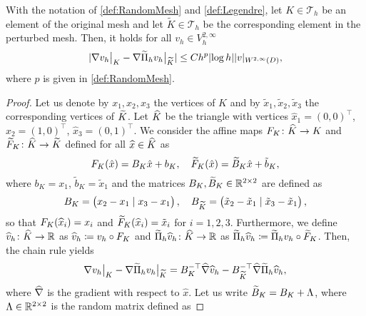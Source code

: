 \documentclass[10pt]{article}
\begin{document}
\begin{lemma}\label{lem:Interp_BoundKKTilde} With the notation of \cref{def:RandomMesh} and \cref{def:Legendre}, let $K \in \mathcal T_h$ be an element of the original mesh and let $\widetilde K \in \mathcal T_h$ be the corresponding element in the perturbed mesh. Then, it holds for all $v_h \in V_h^{2, \infty}$
	\begin{equation}
		\lvert\nabla v_h\bigr\rvert_{K} - \nabla \widetilde \Pi_h v_h \bigr\rvert_{\widetilde K}\rvert \leq C h^p \lvert\log h\rvert \lvert v\rvert_{W^{2, \infty}(D)},
	\end{equation}
	where $p$ is given in \cref{def:RandomMesh}.
\end{lemma}
\begin{proof} Let us denote by $x_1, x_2, x_3$ the vertices of $K$ and by $\tilde x_1, \tilde x_2, \tilde x_3$ the corresponding vertices of $\widetilde K$. Let $\widehat K$ be the triangle with vertices $\hat x_1 = (0, 0)^\top$, $\hat x_2 = (1, 0)^\top$, $\hat x_3 = (0, 1)^\top$. We consider the affine maps $F_K \colon \widehat K \to K$ and $\widetilde F_K \colon \widehat K \to \widetilde K$ defined for all $\widehat x \in \widehat K$ as 
\begin{equation}
	F_K(\hat x) = B_K\hat x + b_K, \quad \widetilde F_K(\hat x) = \widetilde B_K\hat x + \tilde b_K,
\end{equation}
where $b_K = x_1$, $\tilde b_K = \tilde x_1$ and the matrices $B_K, \widetilde B_K \in \mathbb{R}^{2\times 2}$ are defined as
\begin{equation}
	B_K = \begin{pmatrix} x_2 - x_1 \mid x_3 - x_1 \end{pmatrix}, \quad B_{\widetilde K} = \begin{pmatrix} \tilde x_2 - \tilde x_1 \mid \tilde x_3 - \tilde x_1\end{pmatrix},
\end{equation}
so that $F_K(\widehat x_i) = x_i$ and $\widetilde F_K(\widehat x_i) = \tilde x_i$ for $i = 1, 2, 3$. Furthermore, we define $\widehat v_h \colon \widehat K \to \mathbb{R}$ as $\widehat v_h \coloneqq v_h \circ F_K$ and $\widetilde \Pi_h \widehat v_h\colon \widehat K \to \mathbb{R}$ as $\widetilde \Pi_h \widehat v_h \coloneqq \widetilde \Pi_h v_h \circ \widetilde F_K$. Then, the chain rule yields
\begin{equation}\label{eq:DiffMapToRef}
	\nabla v_h\bigr\rvert_{K} - \nabla \widetilde \Pi_h v_h \bigr\rvert_{\widetilde K} = B_K^{-\top} \widehat \nabla \widehat v_h - B_{\widetilde K}^{-\top} \widehat \nabla \widetilde \Pi_h \widehat v_h,
\end{equation}
where $\widehat \nabla$ is the gradient with respect to $\hat x$. Let us write $\widetilde B_K = B_K + \Lambda$, where $\Lambda \in \mathbb{R}^{2\times 2}$ is the random matrix defined as

\end{proof}
\end{document}
